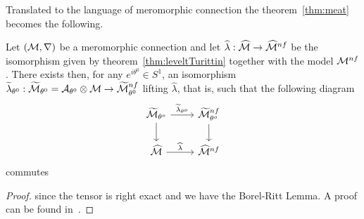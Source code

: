 Translated to the language of meromorphic connection the theorem~\ref{thm:meat}
becomes the following.
\begin{thm}
  Let $(\mathcal{M},\nabla)$ be a meromorphic connection and let
  $\widehat\lambda:\widehat{\mathcal{M}}\to\widehat{\mathcal{M}}^{nf}$ be the isomorphism given by
  theorem~\ref{thm:leveltTurittin} together with the model $\mathcal{M}^{nf}$.
  There exists then, for any $e^{i\theta^0}\in S^1$, an isomorphism
  $\widetilde\lambda_{\theta^0}:
  \widetilde{\mathcal{M}}_{\theta^0}=\mathcal{A}_{\theta^0}\otimes\mathcal{M}\to\widetilde{\mathcal{M}}_{\theta^0}^{nf}$
  lifting $\hat\lambda$, that is, such that the following diagram
  \[ \begin{tikzcd}
      \tilde\cM_{\theta^o} \dar \rar{\tilde\lambda_{\theta^o}} &
      \tilde\cM^{nf}_{\theta^o} \dar
      \\\hat\cM \rar{\hat\lambda} &
      \hat\cM^{nf}
  \end{tikzcd} \]
  commutes
\end{thm}
\begin{proof}
   since the tensor is right exact and we have the
  Borel-Ritt Lemma.
  A proof can be found in~\cite[Sec.II.2.4]{sabbah_cimpa90}.
\end{proof}

\begin{comment}
  \begin{multicols}{2}
    \begin{thm}
      \marginnote{\cite[Thm.II.2.3.1]{sabbah_cimpa90}}
      \rewrite{Let $\cM_{K}$ be a meromorphic connection. There exists an
        integer $q\geq 1$ such that, after the ramification $x=t^q$, one has,
        for all $\theta\in S^1$ and each sufficiently small interval $V$
        centered at $\theta$}
      \[
        \cA_L(V)\otimes_L\cM_L\cong\cA_L(V)\otimes_L
        \left(\cF_L^R\otimes\cG_L\right)
      \]
    \end{thm}
    \begin{proof}
      See \cite[Sec.II.2.4]{sabbah_cimpa90}
    \end{proof}
  \columnbreak
  \end{multicols}
\end{comment}

